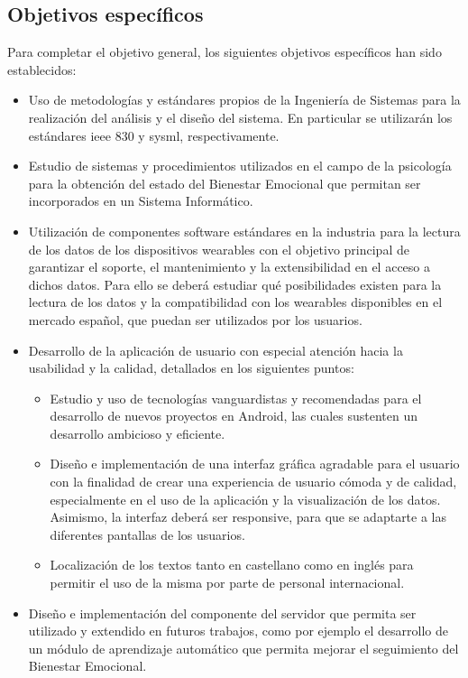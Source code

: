     \subsection{Objetivos específicos}
        Para completar el objetivo general, los siguientes objetivos específicos han sido establecidos:
        \begin{itemize}
            \item Uso de metodologías y estándares propios de la Ingeniería de Sistemas para la realización del análisis y el diseño del sistema. En particular se utilizarán los estándares \gls{ieee} 830 y \gls{sysml}, respectivamente.
            \item Estudio de sistemas y procedimientos utilizados en el campo de la psicología para la obtención del estado del Bienestar Emocional que permitan ser incorporados en un Sistema Informático.
            \item Utilización de componentes software estándares en la industria para la lectura de los datos de los dispositivos \glspl{wearable} con el objetivo principal de garantizar el soporte, el mantenimiento y la extensibilidad en el acceso a dichos datos. Para ello se deberá estudiar qué posibilidades existen para la lectura de los datos y la compatibilidad con los \glspl{wearable} disponibles en el mercado español, que puedan ser utilizados por los usuarios.
            \item Desarrollo de la aplicación de usuario con especial atención hacia la usabilidad y la calidad, detallados en los siguientes puntos:
            \begin{itemize}
                \item Estudio y uso de tecnologías vanguardistas y recomendadas para el desarrollo de nuevos proyectos en Android, las cuales sustenten un desarrollo ambicioso y eficiente.
                \item Diseño e implementación de una interfaz gráfica agradable para el usuario con la finalidad de crear una experiencia de usuario cómoda y de calidad, especialmente en el uso de la aplicación y la visualización de los datos. Asimismo, la interfaz deberá ser \gls{responsive}, para que se adaptarte a las diferentes pantallas de los usuarios.
                \item Localización de los textos tanto en castellano como en inglés para permitir el uso de la misma por parte de personal internacional.
            \end{itemize}
            \item Diseño e implementación del componente del servidor que permita ser utilizado y extendido en futuros trabajos, como por ejemplo el desarrollo de un módulo de aprendizaje automático que permita mejorar el seguimiento del Bienestar Emocional.
        \end{itemize}


